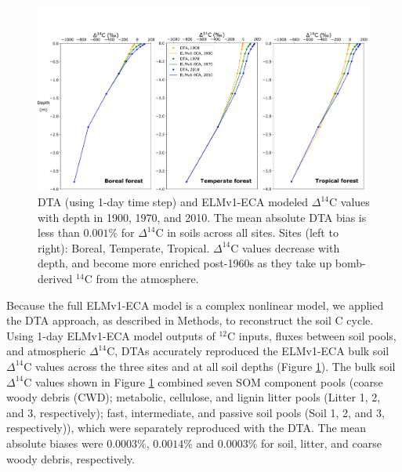 \documentclass[11pt,a4paper]{article}
\begin{document}
\begin{figure}[htbp]
        \centering 
        \includegraphics[width=1.0\linewidth]{figs/depth_profile_10_manual_reorder_relabel.png}
        \caption{DTA (using 1-day time step) and ELMv1-ECA modeled $\Delta^{14}$C values with depth in 1900, 1970, and 2010. The mean absolute DTA bias is less than $0.001$\% for $\Delta^{14}$C in soils across all sites. Sites (left to right): Boreal, Temperate, Tropical. $\Delta^{14}$C values decrease with depth, and become more enriched post-1960s as they take up bomb-derived $^{14}$C from the atmosphere.
        \label{fig:depthProfiles}
        }
\end{figure}      
             


Because the full ELMv1-ECA model is a complex nonlinear model, we applied the DTA approach, as described in Methods, to reconstruct the soil C cycle. Using 1-day ELMv1-ECA model outputs of $^{12}$C inputs, fluxes between soil pools, and atmospheric $\Delta^{14}$C, DTAs accurately reproduced the ELMv1-ECA bulk soil $\Delta^{14}$C values across the three sites and at all soil depths (Figure \ref{fig:depthProfiles}). The bulk soil $\Delta^{14}$C values shown in Figure \ref{fig:depthProfiles} combined seven SOM component pools (coarse woody debris (CWD); metabolic, cellulose, and lignin litter pools (Litter 1, 2, and 3, respectively); fast, intermediate, and passive soil pools (Soil 1, 2, and 3, respectively)), which were separately reproduced with the DTA. The mean absolute biases were $0.0003$\%, $0.0014$\% and $0.0003$\% for soil, litter, and coarse woody debris, respectively.
\end{document}
